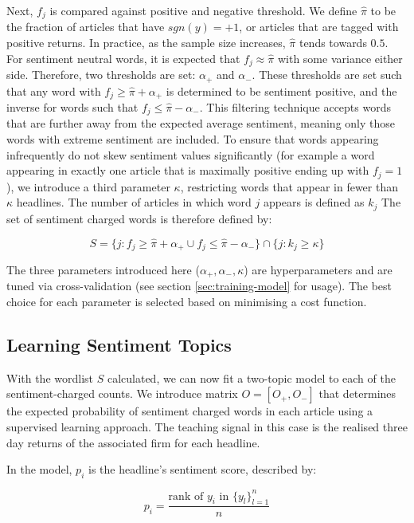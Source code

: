 Next, $f_j$ is compared against positive and negative threshold. We define $\hat \pi$ to be the fraction of articles that have $sgn(y) = +1$, or articles that are tagged with positive returns. In practice, as the sample size increases, $\hat \pi$ tends towards $0.5$. For sentiment neutral words, it is expected that $f_j \approx \hat \pi$ with some variance either side. Therefore, two thresholds are set: $\alpha_+$ and $\alpha_-$. These thresholds are set such that any word with $f_j \ge \hat \pi + \alpha_+$ is determined to be sentiment positive, and the inverse for words such that $f_j \le \hat \pi - \alpha_-$. This filtering technique accepts words that are further away from the expected average sentiment, meaning only those words with extreme sentiment are included. To ensure that words appearing infrequently do not skew sentiment values significantly (for example a word appearing in exactly one article that is maximally positive ending up with $f_j = 1$), we introduce a third parameter $\kappa$, restricting words that appear in fewer than $\kappa$ headlines. The number of articles in which word $j$ appears is defined as $k_j$ The set of sentiment charged words is therefore defined by:

\begin{equation}
S = \{j : f_j \ge \hat \pi + \alpha_+ \cup f_j \le \hat \pi - \alpha_- \} \cap  \{ j : k_j \ge \kappa \}
\end{equation}

\noindent
The three parameters introduced here ($\alpha_+, \alpha_-, \kappa$) are hyperparameters and are tuned via cross-validation (see section \ref{sec:training-model} for usage). The best choice for each parameter is selected based on minimising a cost function.

\subsection{Learning Sentiment Topics}
\label{learn-sentiment}
With the wordlist $S$ calculated, we can now fit a two-topic model to each of the sentiment-charged counts. We introduce matrix $O = [O_+,O_-]$ that determines the expected probability of sentiment charged words in each article using a supervised learning approach. The teaching signal in this case is the realised three day returns of the associated firm for each headline.

In the model, $p_i$ is the headline's sentiment score, described by:

\begin{equation}
p_i = \frac{\text{rank of } y_i \text{ in } \{y_l\}_{l=1}^n}{n}
\label{sentiment}
\end{equation}

